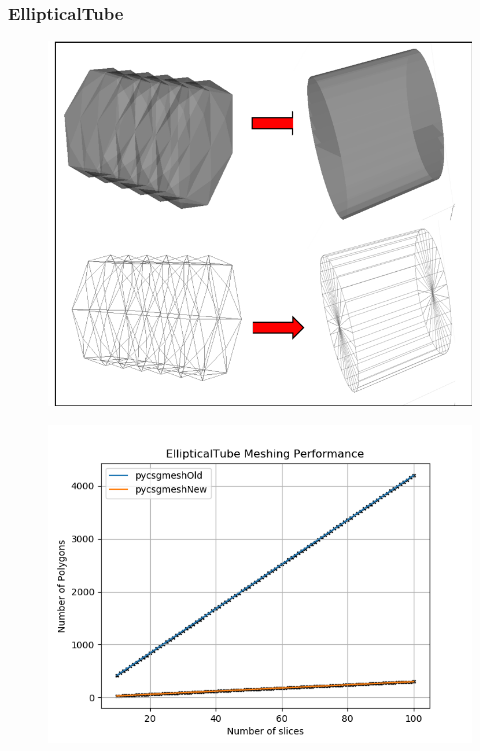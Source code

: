 \documentclass[12pt,a4paper]{article}
\begin{document}
\subsubsection{EllipticalTube}

\begin{figure}[h!]
\centering
\begin{minipage}{.2\textwidth}
  \centering
  \includegraphics[height=0.8\linewidth]{Images//Meshes//ellipticaltube.png}
  \label{fig:test1}
\end{minipage}%
\begin{minipage}{.3\textwidth}
  \centering
  \includegraphics[scale=0.35]{Images//Quad_fits//EllipticalTube_quad.png}
  \label{fig:test2}
\end{minipage}%
\end{figure}
\end{document}
